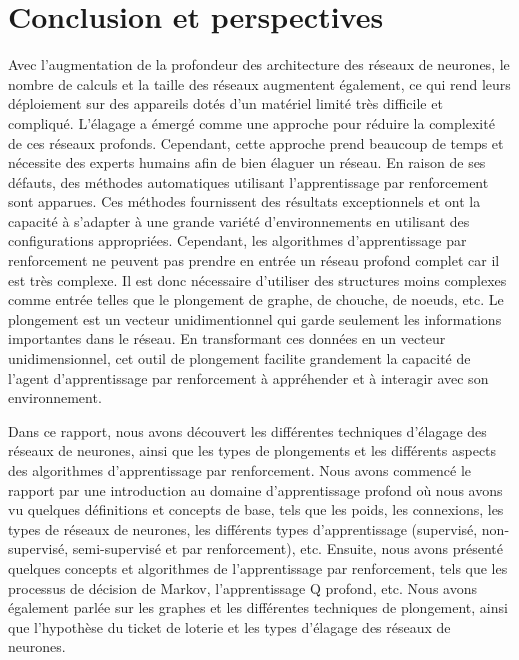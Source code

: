 \chapter*{Conclusion et perspectives}
\label{chap:conclusion}

Avec l'augmentation de la profondeur des architecture des réseaux de neurones, le nombre de calculs et la taille des réseaux augmentent également, ce qui rend leurs déploiement sur des appareils dotés d'un matériel limité très difficile et compliqué. L'élagage a émergé comme une approche pour réduire la complexité de ces réseaux profonds. Cependant, cette approche prend beaucoup de temps et nécessite des experts humains afin de bien élaguer un réseau. En raison de ses défauts, des méthodes automatiques utilisant l'apprentissage par renforcement sont apparues. Ces méthodes fournissent des résultats exceptionnels et ont la capacité à s'adapter à une grande variété d'environnements en utilisant des configurations appropriées. Cependant, les algorithmes d'apprentissage par renforcement ne peuvent pas prendre en entrée un réseau profond complet car il est très complexe. Il est donc nécessaire d'utiliser des structures moins complexes comme entrée telles que le plongement de graphe, de chouche, de noeuds, etc. Le plongement est un vecteur unidimentionnel qui garde seulement les informations importantes dans le réseau. En transformant ces données en un vecteur unidimensionnel, cet outil de plongement facilite grandement la capacité de l'agent d'apprentissage par renforcement à appréhender et à interagir avec son environnement.

Dans ce rapport, nous avons découvert les différentes techniques d'élagage des réseaux de neurones, ainsi que les types de plongements et les différents aspects des algorithmes d'apprentissage par renforcement. Nous avons commencé le rapport par une introduction au domaine d'apprentissage profond où nous avons vu quelques définitions et concepts de base, tels que les poids, les connexions, les types de réseaux de neurones, les différents types d'apprentissage (supervisé, non-supervisé, semi-supervisé et par renforcement), etc. Ensuite, nous avons présenté quelques concepts et algorithmes de l'apprentissage par renforcement, tels que les processus de décision de Markov, l'apprentissage Q profond, etc. Nous avons également parlée sur les graphes et les différentes techniques de plongement, ainsi que l'hypothèse du ticket de loterie et les types d'élagage des réseaux de neurones.

